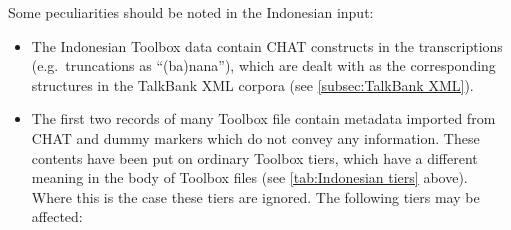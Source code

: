 \documentclass[a4paper, 11pt]{book}
\begin{document}
Some peculiarities should be noted in the Indonesian input: 

\begin{itemize}
	\item The Indonesian Toolbox data contain CHAT constructs in the transcriptions (e.g.\ truncations as “(ba)nana”), 
		which are dealt with as the corresponding structures in the TalkBank XML corpora (see \autoref{subsec:TalkBank XML}).
		
		
	\item The first two records of many Toolbox file contain metadata imported from CHAT and dummy markers which do not convey any
		information. These contents have been put on ordinary Toolbox tiers, which have a different meaning in the body of Toolbox files 
		(see \autoref{tab:Indonesian tiers} above). Where this is the case these tiers are ignored. The following tiers may be affected: 
		

\end{itemize}
\end{document}
